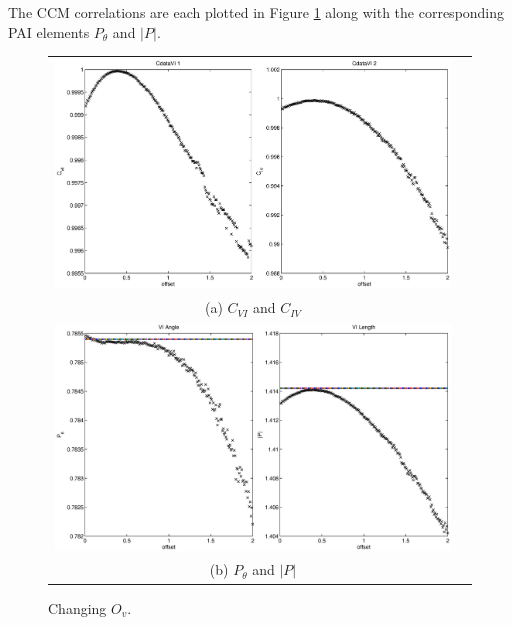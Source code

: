 \documentclass{article}
\begin{document}
The CCM correlations are each plotted in Figure \ref{fig:Ov} along with the corresponding PAI elements $P_\theta$ and $|P|$.
\begin{figure}[H]
\begin{tabular}{cc}
\includegraphics[scale=0.5]{RLcirc_varyV_offset2.eps} \\
(a) $C_{VI}$ and $C_{IV}$ \\[6pt]
\includegraphics[scale=0.5]{RLcirc_varyV_offset.eps} \\
(b) $P_\theta$ and $|P|$ \\[6pt]
\end{tabular}
\caption{Changing $O_v$.}
\label{fig:Ov}
\end{figure}
\end{document}
